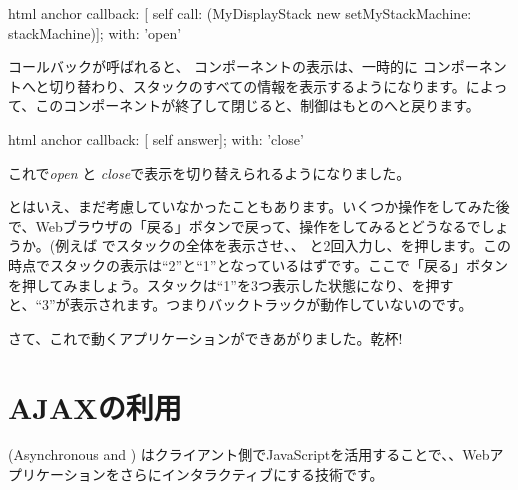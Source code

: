 \documentclass[a4paper,10pt,twoside]{book}
\begin{document}
\begin{code}{}
html anchor
	callback: [ self call: (MyDisplayStack new setMyStackMachine: stackMachine)];
	with: 'open'
\end{code}

コールバックが呼ばれると、 コンポーネントの表示は、一時的に コンポーネントへと切り替わり、スタックのすべての情報を表示するようになります。によって、このコンポーネントが終了して閉じると、制御はもとのへと戻ります。


\begin{code}{}
html anchor
	callback: [ self answer];
	with: 'close'
\end{code}

これで\emph{open} と \emph{close}で表示を切り替えられるようになりました。

とはいえ、まだ考慮していなかったこともあります。いくつか操作をしてみた後で、Webブラウザの「戻る」ボタンで戻って、操作をしてみるとどうなるでしょうか。(例えば でスタックの全体を表示させ、、 と2回入力し、\menu {+}を押します。この時点でスタックの表示は``2''と``1''となっているはずです。ここで「戻る」ボタンを押してみましょう。スタックは``1''を3つ表示した状態になり、\menu {+}を押すと、``3''が表示されます。つまりバックトラックが動作していないのです。


さて、これで動くアプリケーションができあがりました。乾杯!

\section{AJAXの利用}


 (Asynchronous  and ) はクライアント側でJavaScriptを活用することで、、Webアプリケーションをさらにインタラクティブにする技術です。
\end{document}
